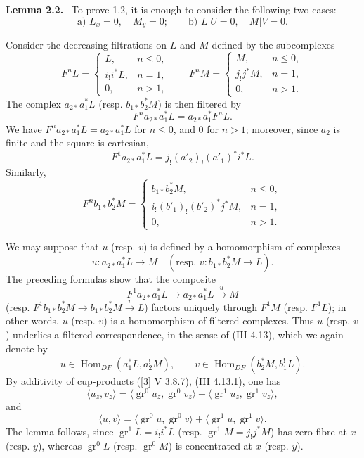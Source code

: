 \documentclass[11pt]{article}
\newenvironment{statement}[1]{\par\medskip\noindent\textbf{#1.}\ }{\par\medskip}
\DeclareMathOperator{\Hom}{Hom}
\providecommand{\Hom}{\operatorname{Hom}}
\begin{document}
\begin{statement}{Lemma 2.2}
To prove 1.2, it is enough to consider the following two cases:
\[
\text{a) } L_x=0,\quad M_y=0;\qquad
\text{b) } L|U=0,\quad M|V=0 .
\]
\end{statement}

Consider the decreasing filtrations on $L$ and $M$ defined by the subcomplexes
\[
F^nL=
\begin{cases}
L,& n\le 0,\\
i_!i^*L,& n=1,\\
0,& n>1,
\end{cases}
\qquad
F^nM=
\begin{cases}
M,& n\le 0,\\
j_!j^*M,& n=1,\\
0,& n>1.
\end{cases}
\]
The complex $a_{2*}a_1^*L$ (resp. $b_{1*}b_2^*M$) is then filtered by
\[
F^n a_{2*}a_1^*L=a_{2*}a_1^*F^nL.
\]
We have $F^n a_{2*}a_1^*L=a_{2*}a_1^*L$ for $n\le0$, and $0$ for $n>1$; moreover, since $a_2$ is finite and the square is cartesian,
\[
F^1a_{2*}a_1^*L=j_!(a'_2)_!(a'_1)^*i^*L.
\]
Similarly,
\[
F^n b_{1*}b_2^*M=
\begin{cases}
b_{1*}b_2^*M,& n\le 0,\\
i_!(b'_1)_!(b'_2)^*j^*M,& n=1,\\
0,& n>1.
\end{cases}
\]

We may suppose that $u$ (resp. $v$) is defined by a homomorphism of complexes
\[
u:a_{2*}a_1^*L\longrightarrow M
\quad
(\text{resp. }v:b_{1*}b_2^*M\longrightarrow L).
\]
The preceding formulas show that the composite
\[
F^1a_{2*}a_1^*L\longrightarrow a_{2*}a_1^*L\xrightarrow{u}M
\]
(resp. $F^1b_{1*}b_2^*M\to b_{1*}b_2^*M\xrightarrow{v}L$) factors uniquely through $F^1M$ (resp. $F^1L$); in other words, $u$ (resp. $v$) is a homomorphism of filtered complexes. Thus $u$ (resp. $v$) underlies a filtered correspondence, in the sense of (III 4.13), which we again denote by
\[
u\in\Hom_{DF}(a_1^*L,a_2^!M),\qquad
v\in\Hom_{DF}(b_2^*M,b_1^!L).
\]
By additivity of cup-products ([3] V 3.8.7), (III 4.13.1), one has
\[
\langle u_z,v_z\rangle
 =\langle \operatorname{gr}^0u_z,\operatorname{gr}^0v_z\rangle
 +\langle \operatorname{gr}^1u_z,\operatorname{gr}^1v_z\rangle,
\]
and
\[
\langle u,v\rangle
 =\langle \operatorname{gr}^0u,\operatorname{gr}^0v\rangle
 +\langle \operatorname{gr}^1u,\operatorname{gr}^1v\rangle.
\]
The lemma follows, since $\operatorname{gr}^1L=i_!i^*L$ (resp. $\operatorname{gr}^1M=j_!j^*M$) has zero fibre at $x$ (resp. $y$), whereas $\operatorname{gr}^0L$ (resp. $\operatorname{gr}^0M$) is concentrated at $x$ (resp. $y$).
\end{document}

